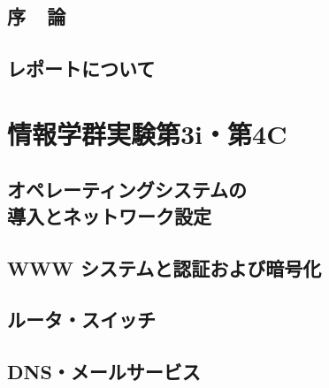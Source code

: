 \documentclass[10pt]{text2002}
\title{}
\author{}
\date{}
\begin{document}
\sloppy
\maketitle
\chapter*{序~~論}\label{chapter:introduction}

\clearpage
\chapter*{レポートについて}\label{chapter:report}


 \tableofcontents
\clearpage


\part{情報学群実験第3i・第4C}\label{part:1}


\chapter[オペレーティングシステムの導入とネットワーク設定]
{オペレーティングシステムの\\導入とネットワーク設定}\label{ch:os}
\def\chapos{01_os/}

\def\chapnet{01_os/}


\chapter{WWW システムと認証および暗号化}



\chapter{ルータ・スイッチ}\label{ch:patch}
\def\chaprouter{02_router_sw/}

\clearpage
\def\chapsw{02_router_sw/}


\chapter{DNS・メールサービス}\label{ch:dns}
\def\chapdns{03_dns_mail/}

\clearpage
\def\chapmail{03_dns_mail/}

\end{document}
